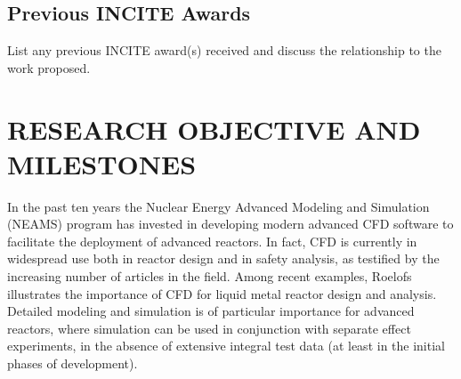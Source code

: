 \documentclass[11pt,letterpaper,english]{article}
\begin{document}

\vspace{-.25in}
\subsection{Previous INCITE Awards}
\vspace{-.2in}


List any previous INCITE award(s) received and discuss the relationship to the work proposed. 


\vspace{-.25in}
\section{RESEARCH OBJECTIVE AND MILESTONES} %
\vspace{-.2in}


In the past ten years the Nuclear Energy Advanced Modeling and Simulation (NEAMS) program \cite{sofu2017us} has invested in developing modern advanced CFD software to facilitate the deployment of advanced reactors. In fact, CFD is currently in widespread use both in reactor design and in safety analysis, as testified by the increasing number of articles in the field. Among recent examples, Roelofs \cite{roelofs2018thermal} illustrates the importance of CFD for liquid metal reactor design and analysis. Detailed modeling and simulation is of particular importance for advanced reactors, where simulation can be used in conjunction with separate effect experiments, in the absence of extensive integral test data (at least in the initial phases of development).
\end{document}
